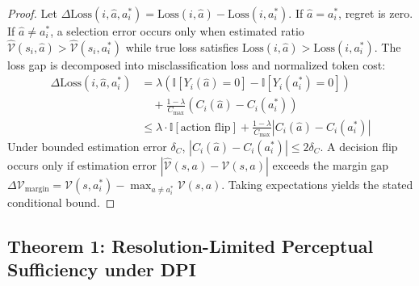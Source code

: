 \documentclass[11pt]{article}
\begin{document}
\begin{proof}
Let $\Delta \text{Loss}(i, \hat{a}, a^*_i) = \text{Loss}(i, \hat{a}) - \text{Loss}(i, a^*_i)$. If $\hat{a} = a^*_i$, regret is zero. If $\hat{a} \neq a^*_i$, a selection error occurs only when estimated ratio $\hat{\mathcal{V}}(s_i, \hat{a}) > \hat{\mathcal{V}}(s_i, a^*_i)$ while true loss satisfies $\text{Loss}(i, \hat{a}) > \text{Loss}(i, a^*_i)$. The loss gap is decomposed into misclassification loss and normalized token cost:
\begin{align}
\Delta \text{Loss}(i, \hat{a}, a^*_i) &= \lambda (\mathbb{I}[Y_i(\hat{a})=0] - \mathbb{I}[Y_i(a^*_i)=0]) \nonumber \\
&\quad + \frac{1 - \lambda}{C_{\max}} (C_i(\hat{a}) - C_i(a^*_i)) \\
&\le \lambda \cdot \mathbb{I}[\text{action flip}] + \frac{1 - \lambda}{C_{\max}} |C_i(\hat{a}) - C_i(a^*_i)| \nonumber
\end{align}
Under bounded estimation error $\delta_C$, $|C_i(\hat{a}) - C_i(a^*_i)| \le 2\delta_C$. A decision flip occurs only if estimation error $|\hat{\mathcal{V}}(s, a) - \mathcal{V}(s, a)|$ exceeds the margin gap $\Delta \mathcal{V}_{\text{margin}} = \mathcal{V}(s, a^*_i) - \max_{a \neq a^*_i} \mathcal{V}(s, a)$. Taking expectations yields the stated conditional bound.
\end{proof}

\subsection{Theorem 1: Resolution-Limited Perceptual Sufficiency under DPI}
\end{document}
